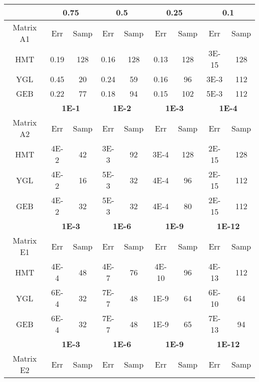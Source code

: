 
\begin{table}
\begin{center}
\begin{tabular}{|c|c|c|c|c|c|c|c|c|}
\cline{2-9}
\multicolumn{1}{c|}{} &
\multicolumn{2}{|c|}{\textbf{0.75}} & \multicolumn{2}{|c|}{\textbf{0.5}} &
\multicolumn{2}{|c|}{\textbf{0.25}} & \multicolumn{2}{|c|}{\textbf{0.1}} \\
\hline
Matrix A1 &
Err & Samp & Err & Samp &
Err & Samp & Err & Samp \\
\hline
HMT & 0.19 & 128 & 0.16 & 128 & 0.13 & 128 & 3E-15 & 128 \\
\hline
YGL & 0.45 & 20 & 0.24 & 59 & 0.16 &  96 & 3E-3 & 112 \\
\hline
GEB & 0.22 & 77 & 0.18 & 94 & 0.15 &  102 & 5E-3 & 112 \\
\hline
\hline
\multicolumn{1}{c|}{} &
\multicolumn{2}{|c|}{\textbf{1E-1}} & \multicolumn{2}{|c|}{\textbf{1E-2}} &
\multicolumn{2}{|c|}{\textbf{1E-3}} & \multicolumn{2}{|c|}{\textbf{1E-4}} \\
\hline
Matrix A2 &
Err & Samp & Err & Samp &
Err & Samp & Err & Samp \\
\hline
HMT & 4E-2 & 42 & 3E-3 & 92 & 3E-4 & 128 & 2E-15 & 128 \\
\hline
YGL & 4E-2 & 16 & 5E-3 & 32 & 4E-4 &  96 & 2E-15 & 112 \\
\hline
GEB & 4E-2 & 32 & 5E-3 & 32 & 4E-4 &  80 & 2E-15 & 112 \\
\hline
\hline
\multicolumn{1}{c|}{} &
\multicolumn{2}{|c|}{\textbf{1E-3}} & \multicolumn{2}{|c|}{\textbf{1E-6}} &
\multicolumn{2}{|c|}{\textbf{1E-9}} & \multicolumn{2}{|c|}{\textbf{1E-12}} \\
\hline
Matrix E1 &
Err & Samp & Err & Samp &
Err & Samp & Err & Samp \\
\hline
HMT & 4E-4 & 48 & 4E-7 & 76 & 4E-10 & 96 & 4E-13 & 112 \\
\hline
YGL & 6E-4 & 32 & 7E-7 & 48 & 1E-9  & 64 & 6E-10 & 64 \\
\hline
GEB & 6E-4 & 32 & 7E-7 & 48 & 1E-9  & 65 & 7E-13 & 94 \\
\hline
\hline
\multicolumn{1}{c|}{} &
\multicolumn{2}{|c|}{\textbf{1E-3}} & \multicolumn{2}{|c|}{\textbf{1E-6}} &
\multicolumn{2}{|c|}{\textbf{1E-9}} & \multicolumn{2}{|c|}{\textbf{1E-12}} \\
\hline
Matrix E2 &
Err & Samp & Err & Samp &
Err & Samp & Err & Samp \\

\end{tabular}
\end{center}
\end{table}
